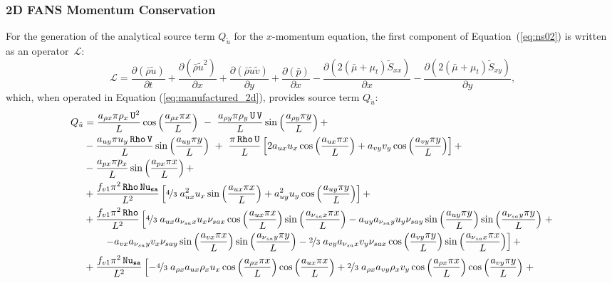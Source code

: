 \documentclass[10pt]{article}
\newcommand{\Diff}[2] {\dfrac{\partial( #1)}{\partial #2}}
\newcommand{\Rho}{\,\mathtt{Rho}}
\newcommand{\U}{\,\mathtt{U}}
\newcommand{\V}{\,\mathtt{V}}
\newcommand{\Nu}{\,\mathtt{Nu_{sa}}}
\newcommand{\Lo}{\,\mathcal{L}}
\newcommand{\brho}{\bar{\rho}}
\newcommand{\bp}{\bar{p}}
\newcommand{\tu}{\tilde{u}}
\newcommand{\tv}{\tilde{v}}
\newcommand{\tS}{\tilde{S}}
\newcommand{\bmu}{\bar{\mu}}
\begin{document}
\subsubsection{2D FANS Momentum Conservation}

For the generation of the analytical source term $Q_{\tu}$ for the $x$-momentum equation, the first component of Equation~(\ref{eq:ns02}) is written as an  operator $\Lo$:
\begin{equation*}
 \Lo= \Diff{\brho \tu}{t} +\Diff{\brho \tu^2 }{x}+\Diff{\brho \tu\tv}{y} +\Diff{\bp}{x}-\Diff{2(\bmu+\mu_t)\tS_{xx}}{x}-\Diff{2(\bmu+\mu_t)\tS_{xy}}{y},
\end{equation*}
which, when operated in Equation (\ref{eq:manufactured_2d}), provides source term $Q_{\tu}$:
\begin{equation}
 \begin{split}
 Q_{\tu} &= \dfrac{a_{\rho x} \pi \rho_x \U^2 }{L} \cos\left(\dfrac{a_{\rho x} \pi x}{L}\right)\,\,-\,\,\dfrac{a_{\rho y} \pi \rho_y \U \V  }{L}\sin\left(\dfrac{a_{\rho y} \pi y}{L}\right)+ \\
&-\dfrac{a_{uy} \pi u_y \Rho \V  }{L}\sin\left(\dfrac{a_{uy} \pi y}{L}\right) \,\,+\,\, \dfrac{\pi \Rho \U}{L}\left[2 a_{ux} u_x  \cos\left(\dfrac{a_{ux} \pi x}{L}\right)+a_{vy} v_y  \cos\left(\dfrac{a_{vy} \pi y}{L}\right)\right]+ \\
&-\dfrac{a_{px} \pi p_x  }{L}\sin\left(\dfrac{a_{px} \pi x}{L}\right)+ \\
&+\dfrac{f_{v1} \pi^2 \Rho \Nu}{L^2}\left[\nicefrac{4}{3} \; a_{ux}^2 u_x  \sin\left(\dfrac{a_{ux} \pi x}{L}\right)+a_{uy}^2 u_y  \cos\left(\dfrac{a_{uy} \pi y}{L}\right)\right] + \\
&+\dfrac{f_{v1} \pi^2 \Rho}{L^2}\left[\nicefrac{4}{3} \; a_{ux} a_{\nu_{sa} x} u_x \nu_{sa x}  \cos\left(\dfrac{a_{ux} \pi x}{L}\right)  \sin\left(\dfrac{a_{\nu_{sa} x} \pi x}{L}\right)- a_{uy} a_{\nu_{sa} y} u_y \nu_{sa y} \sin\left(\dfrac{a_{uy} \pi y}{L}\right)  \sin\left(\dfrac{a_{\nu_{sa} y} \pi y}{L}\right)\right.+\\
    &\qquad\left.- a_{vx} a_{\nu_{sa} y} v_x \nu_{sa y} \sin\left(\dfrac{a_{vx} \pi x}{L}\right)  \sin\left(\dfrac{a_{\nu_{sa} y} \pi y}{L}\right)-\nicefrac{2}{3} \;  a_{vy} a_{\nu_{sa} x} v_y \nu_{sa x} \cos\left(\dfrac{a_{vy} \pi y}{L}\right)  \sin\left(\dfrac{a_{\nu_{sa} x} \pi x}{L}\right)\right] + \\
&+\dfrac{f_{v1} \pi^2 \Nu}{L^2}\left[-\nicefrac{4}{3} \; a_{\rho x} a_{ux} \rho_x u_x  \cos\left(\dfrac{a_{\rho x} \pi x}{L}\right)  \cos\left(\dfrac{a_{ux} \pi x}{L}\right)+\nicefrac{2}{3} \; a_{\rho x} a_{vy} \rho_x v_y  \cos\left(\dfrac{a_{\rho x} \pi x}{L}\right)  \cos\left(\dfrac{a_{vy} \pi y}{L}\right)\right.+\\

\end{split}
\end{equation}
\end{document}
